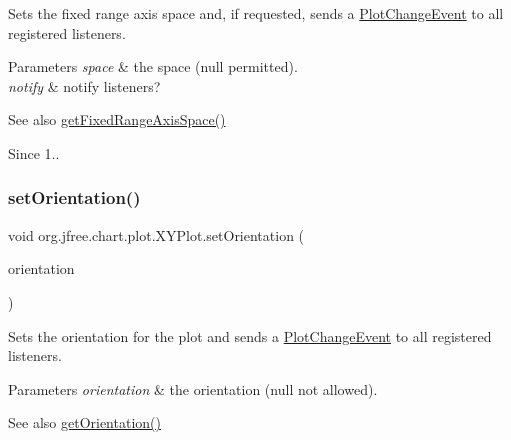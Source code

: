 Sets the fixed range axis space and, if requested, sends a \mbox{\hyperlink{}{Plot\+Change\+Event}} to all registered listeners.


\begin{DoxyParams}{Parameters}
{\em space} & the space ({\ttfamily null} permitted). \\
\hline
{\em notify} & notify listeners?\\
\hline
\end{DoxyParams}
\begin{DoxySeeAlso}{See also}
\mbox{\hyperlink{classorg_1_1jfree_1_1chart_1_1plot_1_1_x_y_plot_a26ddb69807bccbfb340cab756a2e0521}{get\+Fixed\+Range\+Axis\+Space()}}
\end{DoxySeeAlso}
\begin{DoxySince}{Since}
1.. 
\end{DoxySince}
\mbox{\label{classorg_1_1jfree_1_1chart_1_1plot_1_1_x_y_plot_ad73a9df6f61a586d34de8ac37303025b}} 
\subsubsection{\texorpdfstring{set\+Orientation()}{setOrientation()}}
{\footnotesize\ttfamily void org.\+jfree.\+chart.\+plot.\+X\+Y\+Plot.\+set\+Orientation (\begin{DoxyParamCaption}\item[{\mbox{\hyperlink{classorg_1_1jfree_1_1chart_1_1plot_1_1_plot_orientation}{Plot\+Orientation}}}]{orientation }\end{DoxyParamCaption})}

Sets the orientation for the plot and sends a \mbox{\hyperlink{}{Plot\+Change\+Event}} to all registered listeners.


\begin{DoxyParams}{Parameters}
{\em orientation} & the orientation ({\ttfamily null} not allowed).\\
\hline
\end{DoxyParams}
\begin{DoxySeeAlso}{See also}
\mbox{\hyperlink{classorg_1_1jfree_1_1chart_1_1plot_1_1_x_y_plot_a5b0c5d43d190ffdfc7cdee341c0e6990}{get\+Orientation()}} 
\end{DoxySeeAlso}
\mbox{\label{classorg_1_1jfree_1_1chart_1_1plot_1_1_x_y_plot_a6b22586993f163c5212ed21517b32851}} 
